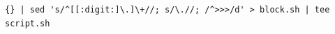 \begin{lstlisting}[style=mybashstyle,
  caption={Příkaz převedení výpisu z konzole na spustitelný skript},
  label={cmd:exec}]
{} | sed 's/^[[:digit:]\.]\+//; s/\.//; /^>>>/d' > block.sh | tee script.sh
\end{lstlisting}
